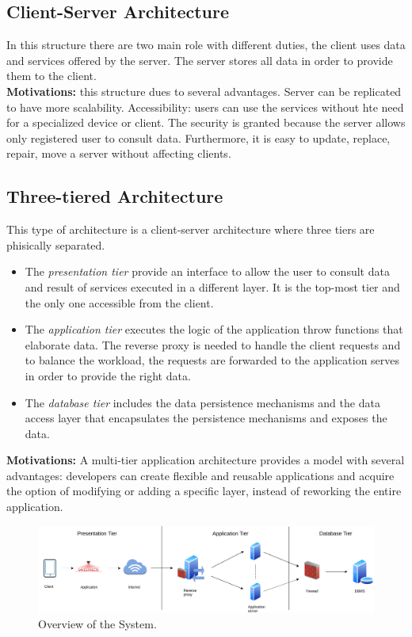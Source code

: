 \documentclass{report}
\begin{document}
\subsection{Client-Server Architecture}
In this structure there are two main role with different duties, the client uses data and services offered by the server.
The server stores all data in order to provide them to the client.\\
\textbf{Motivations:} this structure dues to several advantages. Server can be replicated to have more scalability. 
Accessibility: users can use the services without hte need for a specialized device or client.
The security is granted because the server allows only registered user to consult data.
Furthermore, it is easy to update, replace, repair, move a server without affecting clients.
\subsection{Three-tiered Architecture}
This type of architecture is a client-server architecture where three tiers are phisically separated.
\begin{itemize}
	\item The \textit{presentation tier} provide an interface to allow the user to consult data and result of services executed in a different layer. 
	It is the top-most tier and the only one accessible from the client.
	\item The \textit{application tier} executes the logic of the application throw functions that elaborate data. 
	The reverse proxy is needed to handle the client requests and to balance the workload, the requests are forwarded to 
	the application serves in order to provide the right data.
	\item The \textit{database tier} includes the data persistence mechanisms and the data access layer that encapsulates 
	the persistence mechanisms and exposes the data.
\end{itemize}
\textbf{Motivations:} A multi-tier application architecture provides a model with several advantages: developers can create flexible and reusable 
applications and acquire the option of modifying or adding a specific layer, instead of reworking the entire application.

\begin{figure}[!ht]
	\begin{center}
	\includegraphics[width=\textwidth]{img/TiersArchitecture.png}
	\end{center}
	\caption{Overview of the System.}
\end{figure}
\end{document}

